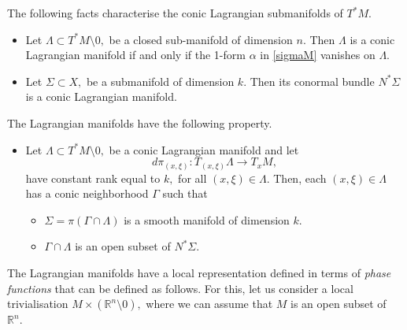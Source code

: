 \documentclass[12pt, reqno]{amsart}
\theoremstyle{definition}
\theoremstyle{remark}
\numberwithin{equation}{section}
\begin{document}
The following facts characterise the conic Lagrangian submanifolds of $T^*M.$
\begin{itemize}
    \item Let $\Lambda\subset T^*M\setminus 0,$ be a closed sub-manifold of dimension $n.$ Then $\Lambda$ is a conic Lagrangian manifold if and only if the 1-form $\alpha$ in \eqref{sigmaM} vanishes on $\Lambda.$
    \item Let $\Sigma\subset X,$ be a submanifold of dimension $k.$ Then its conormal bundle $N^*\Sigma$ is a conic Lagrangian manifold. 
\end{itemize}
The Lagrangian manifolds have the following property.
\begin{itemize}
    \item Let $\Lambda\subset T^{*}M\setminus 0,$ be a conic Lagrangian manifold and let 
    \begin{equation}
        d\pi_{(x,\xi)}:T_{(x,\xi)}\Lambda\rightarrow T_{x}M,
    \end{equation}have constant rank equal to $k,$ for all $(x,\xi)\in \Lambda.$ Then, each $(x,\xi)\in \Lambda$ has a conic neighborhood $\Gamma$ such that 
    \begin{itemize}
        \item[1.] $\Sigma=\pi(\Gamma\cap \Lambda)$ is a smooth manifold of dimension $k.$
        \item[2.] $\Gamma\cap \Lambda$ is an open subset of $N^*\Sigma.$
    \end{itemize}
\end{itemize}


The Lagrangian manifolds have a local representation defined in terms of {\it phase functions} that can be defined as follows. For this, let us consider a local trivialisation $M\times (\mathbb{R}^n\setminus 0), $ where we can assume that $M$ is an open subset of $\mathbb{R}^n.$
\end{document}
